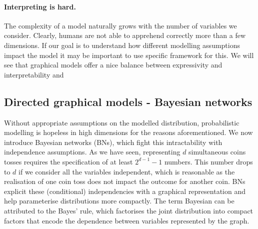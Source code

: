 \paragraph{Interpreting is hard.} The complexity of a model naturally grows with the number of variables we consider. Clearly, humans are not able to apprehend correctly more than a few dimensions. If our goal is to understand how different modelling assumptions impact the model it may be important to use specific framework for this. We will see that graphical models offer a nice balance between expressivity and interpretability and

\subsection{Directed graphical models - Bayesian networks}
Without appropriate assumptions on the modelled distribution, probabilistic modelling is hopeless in high dimensions for the reasons aforementioned. We now introduce Bayesian networks (BNs), which fight this intractability with independence assumptions. As we have seen, representing $d$ simultaneous coins tosses requires the specification of at least $2^{d-1} - 1$ numbers. This number drops to $d$ if we consider all the variables independent, which is reasonable as the realisation of one coin toss does not impact the outcome for another coin. BNs explicit these (conditional) independencies with a graphical representation and help parameterise distributions more compactly. The term Bayesian can be attributed to the Bayes' rule, which factorises the joint distribution into compact factors that encode the dependence between variables represented by the graph.


